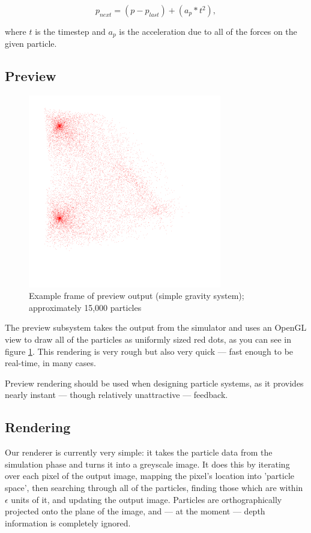 \documentclass{acmsiggraph}
\begin{document}
\begin{equation}
    p_{next}=(p-p_{last}) + (a_p * t^2),
\end{equation}

where $t$ is the timestep and $a_p$ is the acceleration due to all of the forces on the given particle.

\subsection{Preview}

\begin{figure}
    \includegraphics[width=84.5mm]{preview.png}
    \caption{Example frame of preview output (simple gravity system); approximately 15,000 particles}
    \label{fig:preview}
\end{figure}

The preview subsystem takes the output from the simulator and uses an OpenGL view to draw all of the particles as uniformly sized red dots, as you can see in figure \ref{fig:preview}. This rendering is very rough but also very quick --- fast enough to be real-time, in many cases.

Preview rendering should be used when designing particle systems, as it provides nearly instant --- though relatively unattractive --- feedback.

\subsection{Rendering}

Our renderer is currently very simple: it takes the particle data from the simulation phase and turns it into a greyscale image. It does this by iterating over each pixel of the output image, mapping the pixel's location into 'particle space', then searching through all of the particles, finding those which are within $\epsilon$ units of it, and updating the output image. Particles are orthographically projected onto the plane of the image, and --- at the moment --- depth information is completely ignored.
\end{document}
